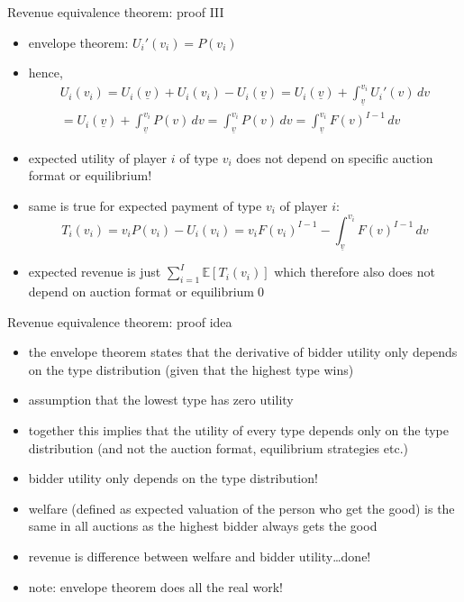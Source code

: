 \documentclass[bigger]{beamer}
\begin{document}
\begin{frame}[label={sec:orgafbb00b}]{Revenue equivalence theorem: proof III}
\begin{itemize}
\item envelope theorem: \(U_i'(v_i)=P(v_i)\)
\item hence,
\begin{multline*}U_i(v_i)=U_i(\underline v) + U_i(v_i)-U_i(\underline v)=U_i(\underline v)+\int_{\underline v}^{v_i}U_i'(v)\,dv\\=U_i(\underline v)+\int_{\underline v}^{v_i}P(v)\,dv=\int_{\underline v}^{v_i}P(v)\,dv= \int_{\underline v}^{v_i}F(v)^{I-1}\,dv\end{multline*}
\item expected utility of player \(i\) of type \(v_i\) does not depend on specific auction format or equilibrium!
\item same is true for expected payment of type \(v_i\) of player \(i\):
$$T_i(v_i)=v_i P(v_i) -U_i(v_i)=v_i F(v_i)^{I-1} -\int_{\underline v}^{v_i}F(v)^{I-1}\,dv$$
\item expected revenue is just \(\sum_{i=1}^I \mathbb{E}[T_i(v_i)]\) which therefore also does not depend on auction format or equilibrium\qed
\end{itemize}
\end{frame}

\begin{frame}[label={sec:org4d3d658}]{Revenue equivalence theorem: proof idea}
\begin{itemize}
\item the envelope theorem states that the derivative of bidder utility only depends on the type distribution (given that the highest type wins)
\item assumption that the lowest type has zero utility
\item together this implies that the utility of every type depends only on the type distribution (and not the auction format, equilibrium strategies etc.)
\item bidder utility only depends on the type distribution!
\item welfare (defined as expected valuation of the person who get the good) is the same in all auctions as the highest bidder always gets the good
\item revenue is difference between welfare and bidder utility\ldots{}done!
\item note: envelope theorem does all the real work!
\end{itemize}
\end{frame}
\end{document}
